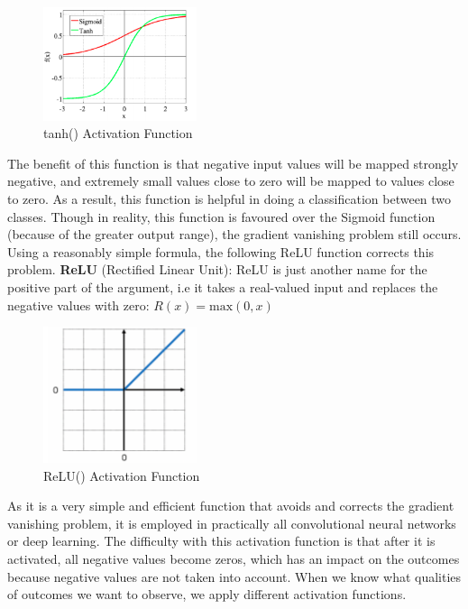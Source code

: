 \documentclass[a4paper,11pt,oneside]{book}
\begin{document}
\begin{figure}[!h]
	\centering
	\includegraphics[width=0.4\textwidth]{figures/tanh}
	\caption{tanh() Activation Function}
	\label{fourthfig}
\end{figure}

The benefit of this function is that negative input values will be mapped strongly negative, and extremely small values close to zero will be mapped to values close to zero. As a result, this function is helpful in doing a classification between two classes.
Though in reality, this function is favoured over the Sigmoid function (because of the greater output range), the gradient vanishing problem still occurs. Using a reasonably simple formula, the following ReLU function corrects this problem.\newline\newline
\textbf{ReLU} (Rectified Linear Unit): ReLU is just another name for the positive part of the argument, i.e it takes a real-valued input and replaces the negative values with zero:
\newline\newline
$R(x)= \text{max}(0,x)$
\begin{figure}[!h]
	\centering
	\includegraphics[width=0.4\textwidth]{figures/Relu}
	\caption{ReLU() Activation Function}
	\label{fifthfig}
\end{figure}
\newline\newline As it is a very simple and efficient function that avoids and corrects the gradient vanishing problem, it is employed in practically all convolutional neural networks or deep learning.
The difficulty with this activation function is that after it is activated, all negative values become zeros, which has an impact on the outcomes because negative values are not taken into account.
\newline\newline When we know what qualities of outcomes we want to observe, we apply different activation functions.
\end{document}
